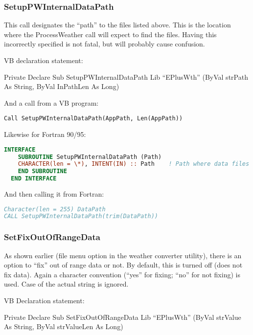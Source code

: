 \subsubsection{SetupPWInternalDataPath}\label{setuppwinternaldatapath}

This call designates the ``path'' to the files listed above. This is the location where the ProcessWeather call will expect to find the files. Having this incorrectly specified is not fatal, but will probably cause confusion.

VB declaration statement:

Private Declare Sub SetupPWInternalDataPath Lib ``EPlusWth'' (ByVal strPath As String, ByVal InPathLen As Long)

And a call from a VB program:

\begin{lstlisting}
Call SetupPWInternalDataPath(AppPath, Len(AppPath))
\end{lstlisting}

Likewise for Fortran 90/95:

\begin{lstlisting}[language=Fortran]
  INTERFACE
    SUBROUTINE SetupPWInternalDataPath (Path)
    CHARACTER(len = \*), INTENT(IN) :: Path    ! Path where data files reside
    END SUBROUTINE
  END INTERFACE
\end{lstlisting}

And then calling it from Fortran:

\begin{lstlisting}[language=Fortran]
Character(len = 255) DataPath
CALL SetupPWInternalDataPath(trim(DataPath))
\end{lstlisting}

\subsubsection{SetFixOutOfRangeData}\label{setfixoutofrangedata}

As shown earlier (file menu option in the weather converter utility), there is an option to ``fix'' out of range data or not. By default, this is turned off (does not fix data). Again a character convention (``yes'' for fixing; ``no'' for not fixing) is used. Case of the actual string is ignored.

VB Declaration statement:

Private Declare Sub SetFixOutOfRangeData Lib ``EPlusWth'' (ByVal strValue As String, ByVal strValueLen As Long)

